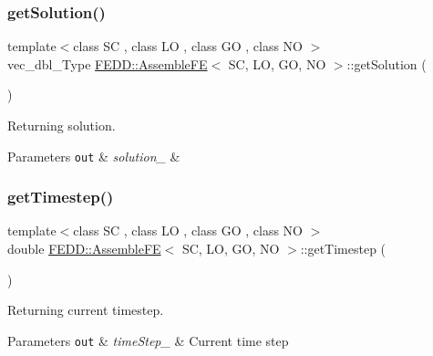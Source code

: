 \subsubsection{\texorpdfstring{get\+Solution()}{getSolution()}}
{\footnotesize\ttfamily template$<$class SC , class LO , class GO , class NO $>$ \\
vec\+\_\+dbl\+\_\+\+Type \hyperlink{classFEDD_1_1AssembleFE}{F\+E\+D\+D\+::\+Assemble\+FE}$<$ SC, LO, GO, NO $>$\+::get\+Solution (\begin{DoxyParamCaption}{ }\end{DoxyParamCaption})}



Returning solution. 


\begin{DoxyParams}[1]{Parameters}
\mbox{\tt out}  & {\em solution\+\_\+} & \\
\hline
\end{DoxyParams}
\mbox{\label{classFEDD_1_1AssembleFE_ab6cc0ce0c63df078ee4b6d93b93d928d}} 
\subsubsection{\texorpdfstring{get\+Timestep()}{getTimestep()}}
{\footnotesize\ttfamily template$<$class SC , class LO , class GO , class NO $>$ \\
double \hyperlink{classFEDD_1_1AssembleFE}{F\+E\+D\+D\+::\+Assemble\+FE}$<$ SC, LO, GO, NO $>$\+::get\+Timestep (\begin{DoxyParamCaption}{ }\end{DoxyParamCaption})}



Returning current timestep. 


\begin{DoxyParams}[1]{Parameters}
\mbox{\tt out}  & {\em time\+Step\+\_\+} & Current time step \\
\hline
\end{DoxyParams}
\mbox{\label{classFEDD_1_1AssembleFE_af15eff2c9207ac4c3994a4cfb5a0a7fd}} 
